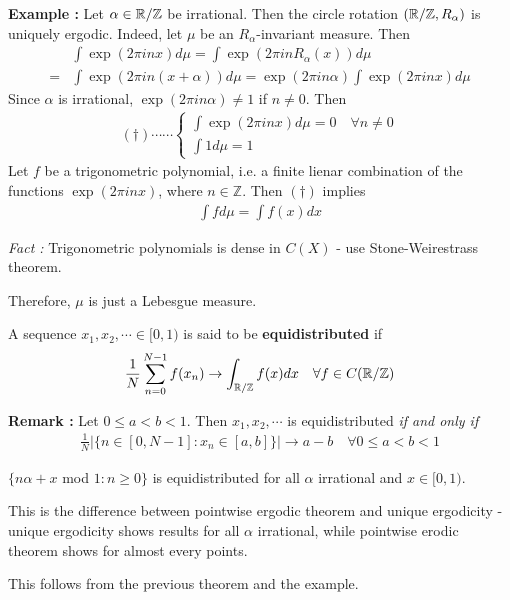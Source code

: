 \documentclass[10pt,a4paper]{report}
\newenvironment{proof}
{\begin{changemargin}{1cm}{0.5cm} 
	}%
	{\end{changemargin}
}
\newenvironment{subproof}
{\begin{changemargin}{0.5cm}{0.5cm}
	}%
	{\end{changemargin}
}
\begin{document}
\textbf{Example :} Let $\alpha \in \mathbb{R} / \mathbb{Z}$ be irrational. Then the circle rotation $(\mathbb{R}/\mathbb{Z},R_{\alpha})$ is uniquely ergodic. Indeed, let $\mu$ be an $R_{\alpha}$-invariant measure. Then
\begin{align*}
& \int \exp (2\pi i n x) d\mu = \int \exp(2\pi i n R_{\alpha}(x)) d\mu \\
=& \int \exp (2\pi i n (x+\alpha)) d\mu = \exp (2\pi i n \alpha) \int \exp (2\pi i n x) d\mu
\end{align*}
Since $\alpha$ is irrational, $\exp(2\pi i n \alpha) \neq 1$ if $n\neq 0$. Then
\begin{align*}
(\dagger)\cdots\cdots \begin{cases}
\int \exp(2\pi i nx)d\mu = 0 \quad \forall n \neq 0 \\
\int 1 d\mu =1
\end{cases}
\end{align*}
Let $f$ be a trigonometric polynomial, i.e. a finite lienar combination of the functions $\exp(2\pi i nx)$, where $n\in \mathbb{Z}$. Then $(\dagger)$ implies
\begin{align*}
\int f d\mu = \int f(x) dx
\end{align*}
\begin{subproof}
\emph{Fact :} Trigonometric polynomials is dense in $C(X)$ - use Stone-Weirestrass theorem.
\end{subproof}
Therefore, $\mu$ is just a Lebesgue measure.
\s

 A sequence $x_1,x_2, \cdots \in [0,1)$ is said to be \textbf{equidistributed} if
\begin{align*}
\frac{1}{N} \sum_{n=0}^{N-1} f(x_n) \rightarrow \int_{\mathbb{R}/\mathbb{Z}} f(x) dx \quad \forall f \in C(\mathbb{R}/\mathbb{Z})
\end{align*}
\s

\textbf{Remark : } Let $0\leq a< b<1$. Then $x_1,x_2,\cdots$ is equidistributed \emph{if and only if}
\begin{align*}
\frac{1}{N} \Big| \{n\in [0,N-1] : x_n \in [a,b] \} \Big| \rightarrow a-b \quad \forall 0\leq a< b<1
\end{align*}
\s

\cor $\{n\alpha + x$ mod $1 : n\geq 0\}$ is equidistributed for all $\alpha$ irrational and $x\in [0,1)$.
\s

This is the difference between pointwise ergodic theorem and unique ergodicity - unique ergodicity shows results for all $\alpha$ irrational, while pointwise erodic theorem shows for almost every points.
\begin{proof}
\pf This follows from the previous theorem and the example.
\end{proof}
\end{document}
